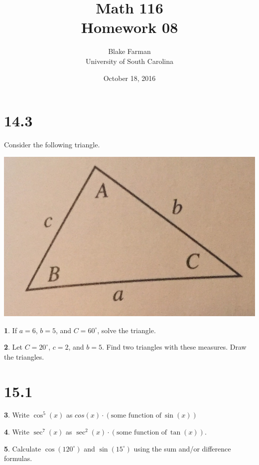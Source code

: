 \documentclass[12pt]{book}
\author{Blake Farman\\University of South Carolina}
\title{Math 116\\Homework 08}
\date{October 18, 2016}
\theoremstyle{definition}
\newtheorem{thm}{}
\begin{document}
\maketitle

\section*{14.3}
\renewcommand{\exp}[1]{\operatorname{e}^{#1}}
Consider the following triangle.\\
\begin{center}
  \includegraphics[scale=0.25]{triangle.jpg}
\end{center}
\setcounter{thm}{1}
\begin{thm}
  If $a = 6$, $b = 5$, and $C = 60^\circ$, solve the triangle.
\end{thm}

\setcounter{thm}{3}
\begin{thm}
  Let $C = 20^\circ$, $c = 2$, and $b = 5$.
  Find two triangles with these measures.
  Draw the triangles.
\end{thm}

\section*{15.1}

\setcounter{thm}{1}
\begin{thm}
  Write $\cos^5(x)$ as $cos(x) \cdot (\text{some function of}\ \sin(x))$
\end{thm}

\setcounter{thm}{3}
\begin{thm}
  Write $\sec^7(x)$ as $\sec^2(x) \cdot (\text{some function of}\ \tan(x))$.
\end{thm}

\setcounter{thm}{5}
\begin{thm}
  Calculate $\cos(120^\circ)$ and $\sin(15^\circ)$ using the sum and/or difference formulas.
\end{thm}
\end{document}
